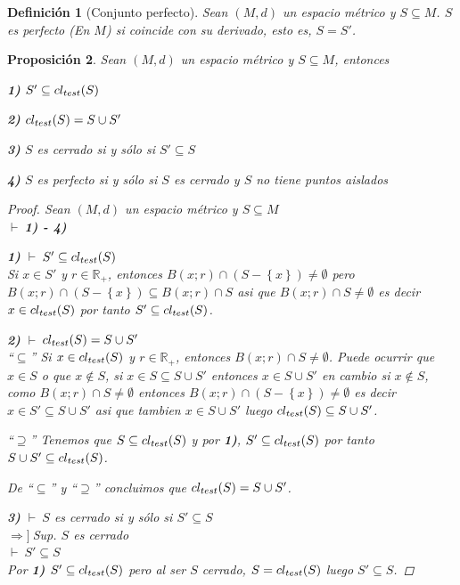 \documentclass[oneside]{book} %
\theoremstyle{Teorema}
\newtheorem{Definicion}{Definición}[chapter]
\newtheorem{Proposicion}[Definicion]{Proposición}
\theoremstyle{Ejemplos}
\theoremstyle{[Obs]}
\def \test {test}
\newcommand{\cerradura}[2][\test]{\ifx \test #1 {\overline{#2}} \else {cl_{#1}(#2)} \fi} %
\renewcommand{\{}{\left\lbrace} %
\renewcommand{\}}{\right\rbrace} %
\renewcommand{\u}{\cup} %
\newcommand{\n}{\cap} %
\renewcommand{\sc}{\subseteq} %
\newcommand{\R}{\mathbb{R}} %
\newcommand{\pd}{$\vdash\ $} %
\newcommand{\necesidad}{$\Rightarrow]\ $} %
\begin{document}
			\begin{Definicion}[Conjunto perfecto]\setlength{\parindent}{0em}
			
				Sean $(M, d)$ un espacio métrico y $S \sc M$. $S$ es perfecto (En $M$) si coincide con su derivado, esto es, $S = S'$.
			
			\end{Definicion}

			\begin{Proposicion}\setlength{\parindent}{0em}
			
				Sean $(M, d)$ un espacio métrico y $S \sc M$, entonces 

				\textbf{1)} $S' \sc \cerradura{S}$

				\textbf{2)} $\cerradura{S} = S \u S'$

				\textbf{3)} $S$ es cerrado si y sólo si $S' \sc S$

				\textbf{4)} $S$ es perfecto si y sólo si $S$ es cerrado y $S$ no tiene puntos aislados

				\begin{proof}
					
					Sean $(M, d)$ un espacio métrico y $S \sc M$ \\ 
					\pd \textbf{1) - 4)}
	
					\textbf{1)} \pd $S' \sc \cerradura{S}$ \\
					Si $x \in S'$ y $r \in \R_{+}$, entonces $B(x;r) \n (S - \{ x \}) \neq \emptyset$ pero $B(x;r) \n (S - \{ x \}) \sc B(x;r) \n S$ asi que $B(x;r) \n S \neq \emptyset$ es decir $x \in \cerradura{S}$ por tanto $S' \sc \cerradura{S}$.

					\textbf{2)} \pd $\cerradura{S} = S \u S'$ \\ 
					``$\sc$'' Si $x \in \cerradura{S}$ y $r \in \R_{+}$, entonces $B(x;r) \n S \neq \emptyset$. Puede ocurrir que $x \in S$ o que $x \notin S$, si $x \in S \sc S \u S'$ entonces $x \in S \u S'$ en cambio si $x \notin S$, como $B(x;r) \n S \neq \emptyset$ entonces $B(x;r) \n (S - \{ x \}) \neq \emptyset$ es decir $x \in S' \sc S \u S'$ asi que tambien $x \in S \u S'$ luego $\cerradura{S} \sc S \u S'$.
	
					``$\supseteq$'' Tenemos que $S \sc \cerradura{S}$ y por \textbf{1)}, $S' \sc \cerradura{S}$ por tanto $S \u S' \sc \cerradura{S}$.

					De ``$\sc$'' y ``$\supseteq$'' concluimos que $\cerradura{S} = S \u S'$.

					\textbf{3)} \pd $S$ es cerrado si y sólo si $S' \sc S$ \\ 
					\necesidad Sup. $S$ es cerrado \\ 
					\pd $S' \sc S$ \\ 
					Por \textbf{1)} $S' \sc \cerradura{S}$ pero al ser $S$ cerrado, $S = \cerradura{S}$ luego $S' \sc S$. 


\end{proof}
\end{Proposicion}
\end{document}
